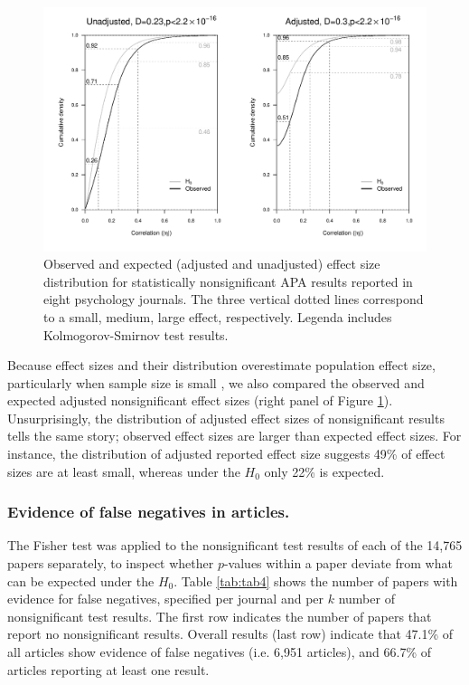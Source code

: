 \documentclass{article}
\begin{document}
\begin{figure}
\begin{center}
\includegraphics[width=\textwidth]{../figures/Fig3.pdf}
\end{center}
\caption{Observed and expected (adjusted and unadjusted) effect size distribution for statistically nonsignificant APA results reported in eight psychology journals. The three vertical dotted lines correspond to a small, medium, large effect, respectively. Legenda includes Kolmogorov-Smirnov test results.}
\label{fig:fig3}
\end{figure}

Because effect sizes and their distribution overestimate population effect size, particularly when sample size is small \cite{Voelkle2007-at,Hedges1981-og}, we also compared the observed and expected adjusted nonsignificant effect sizes (right panel of Figure \ref{fig:fig3}). Unsurprisingly, the distribution of adjusted effect sizes of nonsignificant results tells the same story; observed effect sizes are larger than expected effect sizes. For instance, the distribution of adjusted reported effect size suggests 49\% of effect sizes are at least small, whereas under the $H_0$ only 22\% is expected.

\subsubsection*{Evidence of false negatives in articles.}


The Fisher test was applied to the nonsignificant test results of each of the 14,765 papers separately, to inspect whether $p$-values within a paper deviate from what can be expected under the $H_0$. Table \ref{tab:tab4} shows the number of papers with evidence for false negatives, specified per journal and per $k$ number of nonsignificant test results. The first row indicates the number of papers that report no nonsignificant results. Overall results (last row) indicate that 47.1\% of all articles show evidence of false negatives (i.e. 6,951 articles), and 66.7\% of articles reporting at least one result.
\end{document}

